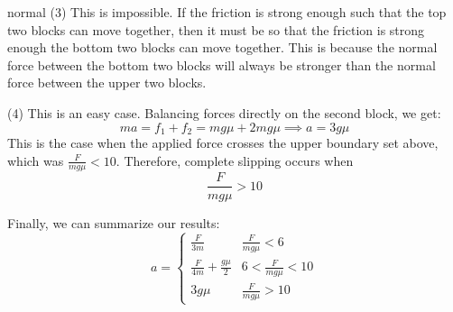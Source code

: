\begin{solution}{normal}
(3) This is impossible. If the friction is strong enough such that the top two blocks can move together, then it must be so that the friction is strong enough the bottom two blocks can move together. This is because the normal force between the bottom two blocks will always be stronger than the normal force between the upper two blocks.
\vspace{3mm}

(4) This is an easy case. Balancing forces directly on the second block, we get:
$$ma=f_1+f_2=mg\mu+2mg\mu \implies a=3g\mu$$
This is the case when the applied force crosses the upper boundary set above, which was $\frac{F}{mg\mu}<10$. Therefore, complete slipping occurs when $$\frac{F}{mg\mu} > 10$$
\vspace{3mm}

Finally, we can summarize our results:
$$
\boxed{
a=
\begin{cases}
\frac{F}{3m} & \frac{F}{mg\mu} < 6 \\
\frac{F}{4m}+\frac{g\mu}{2} & 6<\frac{F}{mg\mu}<10 \\
3g\mu & \frac{F}{mg\mu} > 10
\end{cases}
}
$$
\end{solution}
